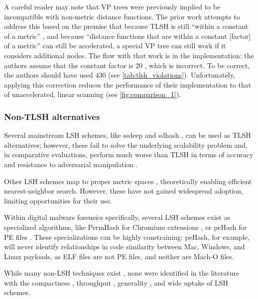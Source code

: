 \documentclass[5p,final]{elsarticle}
\begin{document}
A careful reader may note that VP trees were previously
implied to be incompatible with non-metric distance functions. The
prior work attempts to address this based on the premise that
because TLSH is still \enquote{within a constant of a metric}
\cite{oliverHACTFastSearch2020}, and because \enquote{distance
functions that are within a constant [factor] of a metric} can still
be accelerated, a special VP tree can still work
\cite{oliverHACTFastSearch2020,oliverFastClusteringHigh2021} if it
considers additional nodes. The flaw with that work is in the
implementation: the authors assume that the constant factor is 20
\cite{oliverTlshTlshClusterPylib2021}, which is incorrect.
To be correct, the authors should have used $430$ (see
\autoref{tab:tlsh_violations}). Unfortunately, applying
this correction reduces the performance of their implementation to that
of unaccelerated, linear scanning (see \autoref{fig:comparison_1}).

\subsubsection{Non-TLSH alternatives}

Several mainstream LSH schemes, like ssdeep \cite{kornblumSsdeep2017}
and sdhash \cite{roussevDataFingerprintingSimilarity2010}, can be
used as TLSH alternatives; however, these fail to solve the
underlying scalability problem and, in comparative evaluations,
perform much worse than TLSH in terms of accuracy and resistance to
adversarial manipulation \cite{oliverTLSHLocalitySensitive2013,
	oliverUsingRandomizationAttack2014,
paganiPrecisionRecallUnderstanding2018, azabMiningMalwareDetect2014}.

Other LSH schemes map to proper metric spaces
\cite{guImprovedMethodLocality2013,oprisaLocalitysensitiveHashingOptimizations2014},
theoretically enabling efficient nearest-neighbor search. However,
these have not gained widespread adoption, limiting opportunities
for their use.

Within digital malware forensics specifically, several LSH schemes
exist as specialized algorithms, like PermHash for Chromium extensions
\cite{jaredwilsonPermhashNoCurls2023}, or peHash for PE files
\cite{wicherskiPeHashNovelApproach2009}. These
specializations can be highly constraining: peHash, for example, will
never identify relationships in code similarity between Mac, Windows,
and Linux payloads, as ELF files are not PE files, and neither are Mach-O files.

While many non-LSH techniques exist \cite{haqSurveyBinaryCode2021},
none were identified in the literature with the compactness
\cite{oliverTLSHLocalitySensitive2013}, throughput
\cite{oliverTLSHLocalitySensitive2013, haqSurveyBinaryCode2021,
liTopologyAwareHashingEffective2019}, generality
\cite{oliverTLSHLocalitySensitive2013}, and wide uptake of LSH schemes.
\end{document}
